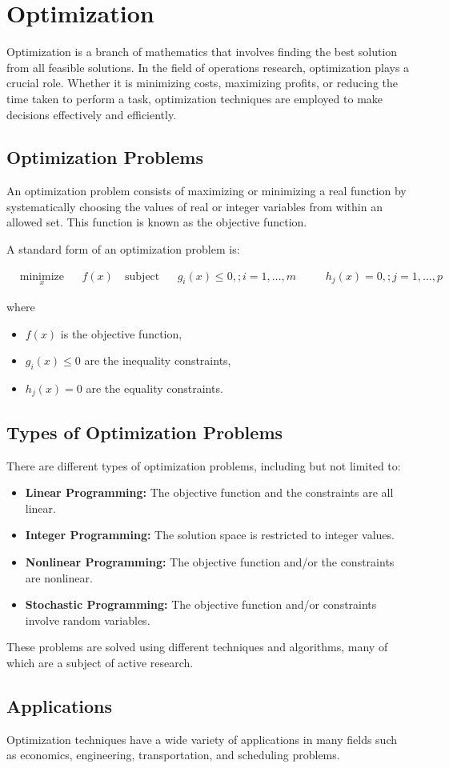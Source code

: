\chapter{Optimization}

Optimization is a branch of mathematics that involves finding the best solution from all feasible solutions. In the field of operations research, optimization plays a crucial role. Whether it is minimizing costs, maximizing profits, or reducing the time taken to perform a task, optimization techniques are employed to make decisions effectively and efficiently.

\section{Optimization Problems}
An optimization problem consists of maximizing or minimizing a real function by systematically choosing the values of real or integer variables from within an allowed set. This function is known as the objective function.

A standard form of an optimization problem is:

\begin{equation*}
\begin{aligned}
& \underset{x}{\text{minimize}}
& & f(x) \
& \text{subject to}
& & g_i(x) \leq 0, ; i = 1, \ldots, m \
&
& & h_j(x) = 0, ; j = 1, \ldots, p
\end{aligned}
\end{equation*}

where
\begin{itemize}
\item $f(x)$ is the objective function,
\item $g_i(x) \leq 0$ are the inequality constraints,
\item $h_j(x) = 0$ are the equality constraints.
\end{itemize}

\section{Types of Optimization Problems}
There are different types of optimization problems, including but not limited to:

\begin{itemize}
\item \textbf{Linear Programming:} The objective function and the constraints are all linear.
\item \textbf{Integer Programming:} The solution space is restricted to integer values.
\item \textbf{Nonlinear Programming:} The objective function and/or the constraints are nonlinear.
\item \textbf{Stochastic Programming:} The objective function and/or constraints involve random variables.
\end{itemize}

These problems are solved using different techniques and algorithms, many of which are a subject of active research.

\section{Applications}
Optimization techniques have a wide variety of applications in many fields such as economics, engineering, transportation, and scheduling problems.

